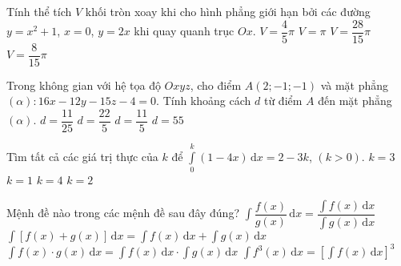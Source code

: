 \begin{ex}%
Tính thể tích $V$ khối tròn xoay khi cho hình phẳng giới hạn bởi các đường $y=x^2+1$, $x=0$, $y=2x$ khi quay quanh trục $Ox$.
\choice
{$V=\dfrac{4}{5}\pi$}
{$V=\pi$}
{$V=\dfrac{28}{15}\pi$}
{\True $V=\dfrac{8}{15}\pi$}
\end{ex}

\begin{ex}%
Trong không gian với hệ tọa độ $Oxyz$, cho điểm $A(2;-1;-1)$ và mặt phẳng $(\alpha)\colon 16x-12y-15z-4=0$. Tính khoảng cách $d$ từ điểm $A$ đến mặt phẳng $(\alpha)$.
\choice
{$d=\dfrac{11}{25}$}
{$d=\dfrac{22}{5}$}
{\True $d=\dfrac{11}{5}$}
{$d=55$}
\end{ex}

\begin{ex}%
Tìm tất cả các giá trị thực của $k$ để $\displaystyle\int\limits_{0}^{k} (1-4x)\mathrm{\,d}x =2-3k$, $(k>0)$.
\choice
{$k=3$}
{\True $k=1$}
{$k=4$}
{$k=2$}
\end{ex}

\begin{ex}%
Mệnh đề nào trong các mệnh đề sau đây đúng?
\choice
{$\displaystyle\int\limits \dfrac{f(x)}{g(x)} \mathrm{\,d}x=\dfrac{\displaystyle\int\limits f(x) \mathrm{\,d}x}{\displaystyle\int\limits g(x) \mathrm{\,d}x}$}
{\True $\displaystyle\int\limits \left[f(x)+g(x)\right] \mathrm{\,d}x =\displaystyle\int\limits f(x) \mathrm{\,d}x +\displaystyle\int\limits g(x) \mathrm{\,d}x $}
{$\displaystyle\int\limits f(x)\cdot g(x) \mathrm{\,d}x =\displaystyle\int\limits f(x) \mathrm{\,d}x \cdot\displaystyle\int\limits g(x) \mathrm{\,d}x $}
{$\displaystyle\int\limits f^3(x) \mathrm{\,d}x =\left[\displaystyle\int\limits f(x) \mathrm{\,d}x \right]^3$}
\end{ex}

